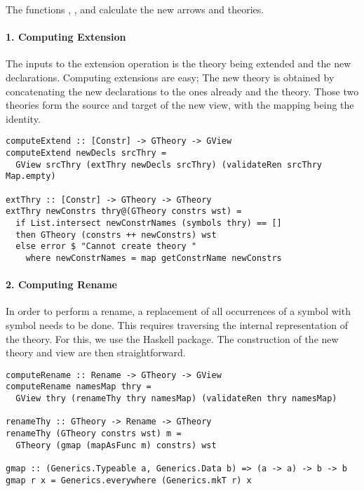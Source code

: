 The functions , , and  calculate the new arrows and theories. 

\paragraph{1. Computing Extension}
The inputs to the extension operation is the theory being extended and the new declarations. Computing extensions are easy; The new theory is obtained by concatenating the new declarations to the ones already and the theory. Those two theories form the source and target of the new view, with the mapping being the identity. 
\begin{verbatim}
computeExtend :: [Constr] -> GTheory -> GView
computeExtend newDecls srcThry =
  GView srcThry (extThry newDecls srcThry) (validateRen srcThry Map.empty)

extThry :: [Constr] -> GTheory -> GTheory 
extThry newConstrs thry@(GTheory constrs wst) =
  if List.intersect newConstrNames (symbols thry) == []
  then GTheory (constrs ++ newConstrs) wst
  else error $ "Cannot create theory "
    where newConstrNames = map getConstrName newConstrs
\end{verbatim}

\paragraph{2. Computing Rename}
In order to perform a rename, a replacement of all occurrences of a symbol  with symbol  needs to be done. This requires traversing the internal representation of the theory. For this, we use the Haskell  package. The construction of the new theory and view are then straightforward.   
\begin{verbatim}
computeRename :: Rename -> GTheory -> GView  
computeRename namesMap thry =
  GView thry (renameThy thry namesMap) (validateRen thry namesMap)

renameThy :: GTheory -> Rename -> GTheory
renameThy (GTheory constrs wst) m =
  GTheory (gmap (mapAsFunc m) constrs) wst
  
gmap :: (Generics.Typeable a, Generics.Data b) => (a -> a) -> b -> b
gmap r x = Generics.everywhere (Generics.mkT r) x  
\end{verbatim}

